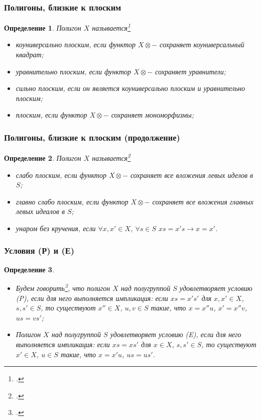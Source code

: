 \documentclass[11pt, notheorems]{beamer}
\newtheorem{definition}{Определение}
\begin{document}
\begin{frame}
	\frametitle{Полигоны, близкие к плоским}

	\begin{definition}
		Полигон $X$ называется\footcite[определения III.9.1 и III.8.1]{kilp}

		\begin{itemize}
			\item коуниверсально плоским, если функтор $X \otimes - $ сохраняет коуниверсальный квадрат;
			\item уравнительно плоским, если функтор $X \otimes - $ сохраняет уравнители;
			\item сильно плоским, если он является коуниверсально плоским и уравнительно плоским;
			\item плоским, если функтор $X \otimes - $ сохраняет мономорфизмы;
		\end{itemize}
	\end{definition}
\end{frame}

\begin{frame}
	\frametitle{Полигоны, близкие к плоским (продолжение)}

	\begin{definition}
		Полигон $X$ называется\footcite[определения III.9.1 и III.8.1]{kilp}

		\begin{itemize}
			\item слабо плоским, если функтор $X \otimes - $ сохраняет все вложения левых иделов в $S$;
			\item главно слабо плоским, если функтор $X \otimes - $ сохраняет все вложения главных левых идеалов в $S$;
			\item унаром без кручения, если $\forall x, x' \in X$, $\forall s \in S$ $xs = x's \rightarrow x = x'$.
		\end{itemize}

	\end{definition}
\end{frame}

\begin{frame}
	\frametitle{Условия (Р) и (Е)}

	\begin{definition}
		\begin{itemize}
			\item Будем говорить\footcite[определение III.9.4]{kilp}, что полигон $X$ над полугруппой $S$ удовлетворяет условию (P), если для него выполняется импликация: если $xs = x' s'$ для $x, x' \in X$, $s, s' \in S$, то существуют $x'' \in X$, $u,v \in S$ такие, что $x = x'' u$, $x' = x'' v$, $u s = v s'$;
			\item Полигон $X$ над полугруппой $S$ удовлетворяет условию (E), если для него выполняется импликация: если $x s = x s'$ для $x \in X$, $s, s' \in S$, то существуют $x' \in X$, $u \in S$ такие, что $x = x' u$, $us = us'$.
		\end{itemize}
	\end{definition}

\end{frame}
\end{document}
